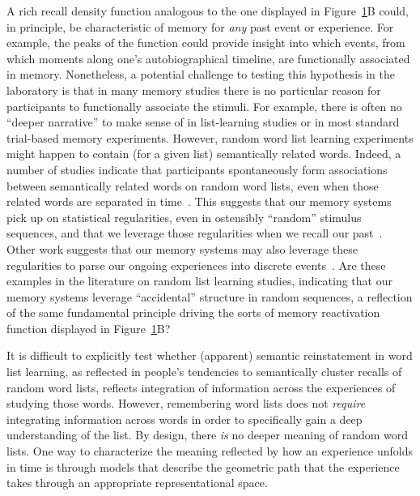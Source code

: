 \documentclass{article}
\begin{document}
\begin{figure}[tp]
\label{fig:reinstatement}
\end{figure}

A rich recall density function analogous to the one displayed in Figure~\ref{fig:reinstatement}B could, in principle, be characteristic of memory for \textit{any} past event or experience.  For example, the peaks of the function could provide insight into which events, from which moments along one's autobiographical timeline, are functionally associated in memory.  Nonetheless, a potential challenge to testing this hypothesis in the laboratory is that in many memory studies there is no particular reason for participants to functionally associate the stimuli.  For example, there is often no ``deeper narrative'' to make sense of in list-learning studies or in most standard trial-based memory experiments.  However, random word list learning experiments might happen to contain (for a given list) semantically related words.  Indeed, a number of studies indicate that participants spontaneously form associations between semantically related words on random word lists, even when those related words are separated in time~\citep[e.g.,][]{WixtRohr94, MannKaha12, MannEtal12}.  This suggests that our memory systems pick up on statistical regularities, even in ostensibly ``random'' stimulus sequences, and that we leverage those regularities when we recall our past~\citep{PolyEtal09}.  Other work suggests that our memory systems may also leverage these regularities to parse our ongoing experiences into discrete events~\citep{SchaEtal13, Shap19}.  Are these examples in the literature on random list learning studies, indicating that our memory systems leverage ``accidental'' structure in random sequences, a reflection of the same fundamental principle driving the sorts of memory reactivation function displayed in Figure~\ref{fig:reinstatement}B?

It is difficult to explicitly test whether (apparent) semantic reinstatement in word list learning, as reflected in people's tendencies to semantically cluster recalls of random word lists, reflects integration of information across the experiences of studying those words.  However, remembering word lists does not \textit{require} integrating information across words in order to specifically gain a deep understanding of the list.  By design, there \textit{is} no deeper meaning of random word lists.  One way to characterize the meaning reflected by how an experience unfolds in time is through models that describe the geometric path that the experience takes through an appropriate representational space.
\end{document}
